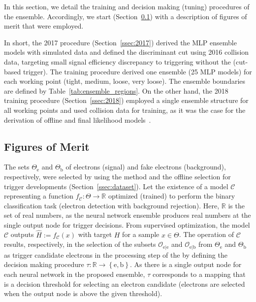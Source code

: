 In this section, we detail the training and decision making (tuning) procedures
of the \rnn ensemble. Accordingly, we start (Section~\ref{ssec:fom}) with a
description of figures of merit that were employed.


In short, the 2017 procedure (Section~\ref{ssec:2017}) derived the MLP ensemble
models with simulated data and defined the discriminant cut using
2016 collision data, targeting small signal efficiency discrepancy to triggering 
without the \rnn{} (cut-based trigger). The training procedure derived one ensemble (25 MLP models) for each working
point (tight, medium, loose, very loose). The ensemble boundaries are defined by Table~\ref{tab:ensemble_regions}. On the other hand, the 2018 training procedure (Section~\ref{ssec:2018})
employed a single ensemble structure for all working points and used
collision data for training, as it was the case for the derivation of offline
and final \hlt likelihood models~\cite{aaboud2019electron}.






\subsection{Figures of Merit}\label{ssec:fom}



The sets $\Theta_{\text{e}}$ and $\Theta_{\text{b}}$ of electrons (signal) and fake electrons (background), respectively, were selected by using the \tnp{} method and the offline selection for trigger developments (Section~\ref{ssec:dataset}). Let the existence of a model $\mathcal{C}$ representing a function $f_{\mathcal{C}} : \Theta \rightarrow \mathbb{R}$ optimized (trained) to perform the binary classification task (electron detection with background rejection). Here, $\mathbb{R}$ is the set of real numbers, as the neural network ensemble produces real numbers at the single output node for trigger decisions.  From supervised optimization, the model $\mathcal{C}$ outputs $\hat{H}:=f_{\mathcal{C}}(x)$ with target $H$ for a sample $x \in \Theta$. The operation of $\mathcal{C}$ results, respectively, in the selection of the subsets $\mathcal{O}_{\text{e}|\text{e}}$ and $\mathcal{O}_{\text{e}|\text{b}}$ from $\Theta_{\text{e}}$ and $\Theta_{\text{b}}$ as trigger candidate electrons in the \fastcalo{} processing step of the \hlt{} by defining the decision making procedure $\tau : \mathbb{R} \rightarrow \left\{\text{e},\text{b}\right\}$. As there is a single output node for each neural network in the proposed \rnn{} ensemble, $\tau$ corresponds to a mapping that is a decision threshold for selecting an electron candidate (electrons are selected when the output node is above the given threshold).  


